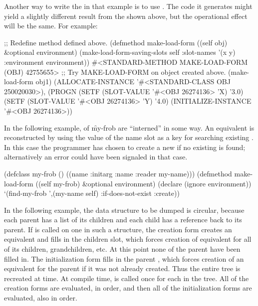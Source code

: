 \medbreak
Another way to write the  
in that example is to use .
The code it generates might yield a slightly different result 
from the   shown above,
but the operational effect will be the same.  For example:
 
\smallbreak
\code
 ;; Redefine method defined above.
 (defmethod make-load-form ((self obj) &optional environment)
    (make-load-form-saving-slots self
                                 :slot-names '(x y)
                                 :environment environment))
\EV #<STANDARD-METHOD MAKE-LOAD-FORM (OBJ) 42755655>
 ;; Try MAKE-LOAD-FORM on object created above.
 (make-load-form obj1)
\EV (ALLOCATE-INSTANCE '#<STANDARD-CLASS OBJ 250020030>),
    (PROGN
      (SETF (SLOT-VALUE '#<OBJ 26274136> 'X) '3.0)
      (SETF (SLOT-VALUE '#<OBJ 26274136> 'Y) '4.0)
      (INITIALIZE-INSTANCE '#<OBJ 26274136>))
\endcode

\medbreak
In the following example,  of \f{my-frob} are ``interned'' 
in some way.  An equivalent  is reconstructed by using the 
value of the name slot as a key for searching existing .
In this case the programmer has chosen to create a new  
if no existing  is found; alternatively an error could 
have been signaled in that case.

\smallbreak
\code
 (defclass my-frob ()
    ((name :initarg :name :reader my-name)))
 (defmethod make-load-form ((self my-frob) &optional environment)
   (declare (ignore environment))
   `(find-my-frob ',(my-name self) :if-does-not-exist :create))
\endcode

\medbreak
In the following example, the data structure to be dumped is circular, 
because each parent has a list of its children and each child has a reference
back to its parent.  If  is called on one   
 in such a structure,  the creation form creates an equivalent 
 and fills in the children slot, which forces creation of equivalent
 for all of its children, grandchildren, etc.  At this point
none of the parent  have been filled in.  
The initialization form fills in the parent , which forces creation 
of an equivalent  for the parent if it was not already created.
Thus the entire tree is recreated at  time.  
At compile time,  is called once for each  
in the tree.  
All of the creation forms are evaluated,
in  order,
and then all of the initialization forms are evaluated, 
also in  order.
 
